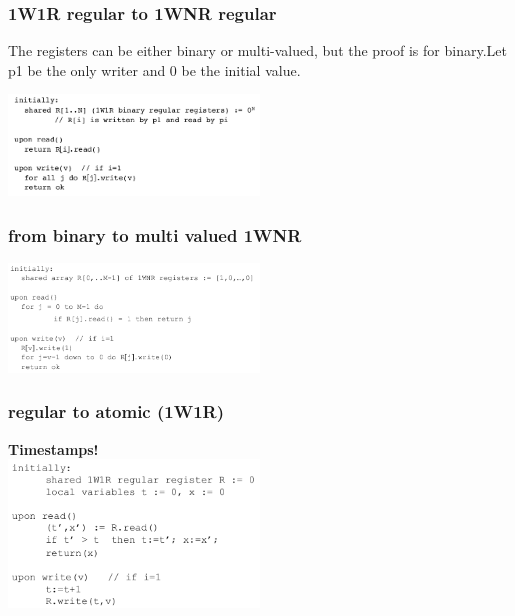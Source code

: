 \documentclass{article}
\theoremstyle{definition}
\begin{document}
\subsubsection{1W1R regular to 1WNR regular}

The registers can be either binary or multi-valued, but the proof is for binary.Let p1 be the only writer and 0 be the initial value.

\begin{center}
\includegraphics[width=0.5\textwidth]{transfo2}
\end{center}

\subsubsection{from binary to multi valued 1WNR}

\begin{center}
\includegraphics[width=0.5\textwidth]{transfo3}
\end{center}

\subsubsection{regular to atomic (1W1R)}

\begin{center}
\large{\textbf{Timestamps!}}\\
\includegraphics[width=0.5\textwidth]{transfo4}
\end{center}
\end{document}
